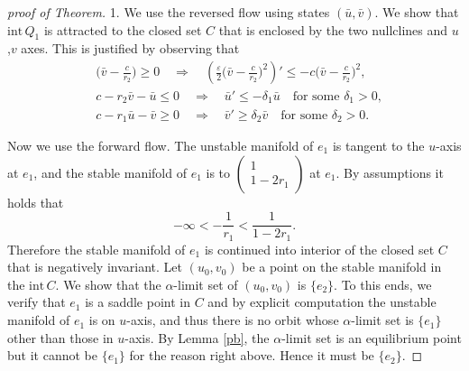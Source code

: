 \documentclass{amsart}
\theoremstyle{definition}
\numberwithin{equation}{section}
\def\ii{{\textrm{int}}\,}
\begin{document}
\begin{proof}[proof of Theorem]
1. We use the reversed flow using states $(\bar u, \bar v)$. We show that $\ii Q_1$ is attracted to the closed set $C$ that is enclosed by the two nullclines and $u$,$v$ axes. This is justified by observing that
\begin{align*}
 &\Big(\bar v- \frac{c}{r_2}\Big) \ge 0 \quad \Longrightarrow \quad \left(\frac{\varepsilon }{2}\Big(\bar v- \frac{c}{r_2}\Big)^2\right)' \le -c \Big(\bar v- \frac{c}{r_2}\Big)^2,\\
&c - r_2\bar v -\bar u\le0 \quad \Longrightarrow \quad\bar u' \le -\delta_1 \bar u \quad \text{for some $\delta_1>0$},\\
 &c - r_1\bar u -\bar v\ge 0 \quad \Longrightarrow \quad\bar v' \ge \delta_2 \bar v \quad \text{for some $\delta_2>0$}.
\end{align*}

Now we use the forward flow. The unstable manifold of $e_1$ is tangent to the $u$-axis at $e_1$, and the stable manifold of $e_1$ is to $\begin{pmatrix} 1 \\ 1-2r_1 \end{pmatrix}$ at $e_1$. By assumptions it holds that
\begin{equation}\label{rel5} -\infty< -\frac{1}{r_1} < \frac{1}{1-2r_1}. \end{equation}
Therefore the stable manifold of $e_1$ is continued into interior of 
the closed set $C$ that is negatively invariant. Let $(u_0,v_0)$ be a point on the stable manifold in the $\ii C$. We show that the $\alpha$-limit set of $(u_0,v_0)$ is $\{e_2\}$. To this ends, we verify that $e_1$ is a saddle point in $C$ and by explicit computation the unstable manifold of $e_1$ is on $u$-axis, and thus there is no orbit whose $\alpha$-limit set is $\{e_1\}$ other than those in $u$-axis. By Lemma \ref{pb}, the $\alpha$-limit set is an equilibrium point but it cannot be $\{e_1\}$ for the reason right above. Hence it must be $\{e_2\}$.


\end{proof}
\end{document}
